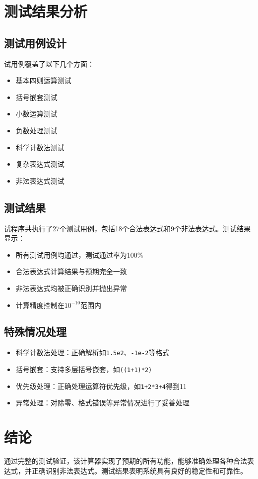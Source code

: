 \documentclass[a4paper,12pt]{article}
\begin{document}
\section{测试结果分析}
\subsection{测试用例设计}
试用例覆盖了以下几个方面：
\begin{itemize}
   \item 基本四则运算测试
   \item 括号嵌套测试
   \item 小数运算测试
   \item 负数处理测试
   \item 科学计数法测试
   \item 复杂表达式测试
   \item 非法表达式测试
\end{itemize}
\subsection{测试结果}
试程序共执行了27个测试用例，包括18个合法表达式和9个非法表达式。测试结果显示：
\begin{itemize}
   \item 所有测试用例均通过，测试通过率为100\%
   \item 合法表达式计算结果与预期完全一致
   \item 非法表达式均被正确识别并抛出异常
   \item 计算精度控制在$10^{-10}$范围内
\end{itemize}
\subsection{特殊情况处理}
\begin{itemize}
   \item 科学计数法处理：正确解析如\texttt{1.5e2}、\texttt{-1e-2}等格式
   \item 括号嵌套：支持多层括号嵌套，如\texttt{((1+1)*2)}
   \item 优先级处理：正确处理运算符优先级，如\texttt{1+2*3+4}得到11
   \item 异常处理：对除零、格式错误等异常情况进行了妥善处理
\end{itemize}
\section{结论}
通过完整的测试验证，该计算器实现了预期的所有功能，能够准确处理各种合法表达式，并正确识别非法表达式。测试结果表明系统具有良好的稳定性和可靠性。
\end{document}
